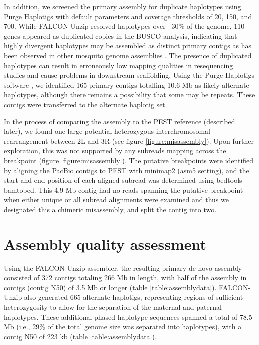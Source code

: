 \par{
In addition, we screened the primary assembly for duplicate haplotypes using Purge Haplotigs \cite{purge} with default parameters and coverage thresholds of 20, 150, and 700. While FALCON-Unzip resolved haplotypes over ~30\% of the genome, 110 genes appeared as duplicated copies in the BUSCO analysis, indicating that highly divergent haplotypes may be assembled as distinct primary contigs as has been observed in other mosquito genome assemblies \cite{aegypti}\cite{funestus}. The presence of duplicated haplotypes can result in erroneously low mapping qualities in resequencing studies and cause problems in downstream scaffolding. Using the Purge Haplotigs software \cite{purge}, we identified 165 primary contigs totalling 10.6 Mb as likely alternate haplotypes, although there remains a possibility that some may be repeats. These contigs were transferred to the alternate haplotig set.
}


\par{
In the process of comparing the assembly to the PEST reference (described later), we found one large potential heterozygous interchromosomal rearrangement between 2L and 3R (see figure \ref{figure:misassembly}). Upon further exploration, this was not supported by any subreads mapping across the breakpoint (figure \ref{figure:misassembly}). The putative breakpoints were identified by aligning the PacBio contigs to PEST with minimap2 (asm5 setting)\cite{minimap2}, and the start and end position of each aligned subread was determined using bedtools bamtobed\cite{bedtools}. This 4.9 Mb contig had no reads spanning the putative breakpoint when either unique or all subread alignments were examined and thus we designated this a chimeric misassembly, and split the contig into two.
}



\section{Assembly quality assessment}


\par{
Using the FALCON-Unzip assembler\cite{falcon}, the resulting primary de novo assembly consisted of 372 contigs totaling 266 Mb in length, with half of the assembly in contigs (contig N50) of 3.5 Mb or longer (table \ref{table:assemblydata}). FALCON-Unzip also generated 665 alternate haplotigs, representing regions of sufficient heterozygosity to allow for the separation of the maternal and paternal haplotypes. These additional phased haplotype sequences spanned a total of 78.5 Mb (i.e., 29\% of the total genome size was separated into haplotypes), with a contig N50 of 223 kb (table \ref{table:assemblydata}). 
}


